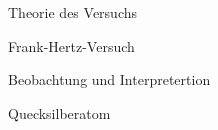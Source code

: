\documentclass[pdftex, a4paper,11pt, twoside, ngerman]{report}
\begin{document}
\begin{chapter}{Theorie des Versuchs}
\begin{section}{Frank-Hertz-Versuch}
\begin{subsection}{Beobachtung und Interpretertion}
      \end{subsection}
      
      
      
      \begin{subsection}{Quecksilberatom}

      \end{subsection}
    

    \end{section}
    
  \end{chapter}
         
         
         
\end{document}
